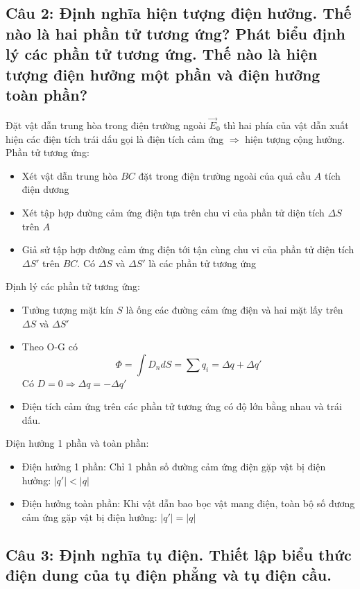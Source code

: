 \subsection[Câu 2]{Câu 2: Định nghĩa hiện tượng điện hưởng. Thế nào là hai phần tử tương ứng? Phát biểu định lý các phần tử tương ứng. Thế nào là hiện tượng điện hưởng một phần và điện hưởng toàn phần?}

Đặt vật dẫn trung hòa trong điện trường ngoài $\vec{E}_0$ thì hai phía của vật dẫn xuất hiện các điện tích trái dấu gọi là điện tích cảm ứng $\Rightarrow$ hiện tượng cộng hưởng.\\

Phần tử tương ứng:
\begin{itemize}
  \item Xét vật dẫn trung hòa $BC$ đặt trong điện trường ngoài của quả cầu $A$ tích điện dương
  \item Xét tập hợp đường cảm ứng điện tựa trên chu vi của phần tử diện tích $\Delta S$ trên $A$
  \item Giả sử tập hợp đường cảm ứng điện tới tận cùng chu vi của phần tử diện tích $\Delta S'$ trên $BC$. Có $\Delta S$ và $\Delta S'$ là các phần tử tương ứng
\end{itemize}

Định lý các phần tử tương ứng:
\begin{itemize}
  \item Tưởng tượng mặt kín $S$ là ống các đường cảm ứng điện và hai mặt lấy trên $\Delta S$ và $\Delta S'$
  \item Theo O-G có 
  \begin{equation*}
    \Phi = \int D_ndS = \sum q_i = \Delta q + \Delta q'
  \end{equation*}
  Có $D = 0 \Rightarrow \Delta q = - \Delta q'$ 
  \item Điện tích cảm ứng trên các phần tử tương ứng có độ lớn bằng nhau và trái dấu.
\end{itemize}

Điện hưởng 1 phần và toàn phần:
\begin{itemize}
  \item Điện hưởng 1 phần: Chỉ 1 phần số đường cảm ứng điện gặp vật bị điện hưởng: $|q'| < |q|$
  \item Điện hưởng toàn phần: Khi vật dẫn bao bọc vật mang điện, toàn bộ số đương cảm ứng gặp vật bị điện hưởng: $|q'| = |q|$
\end{itemize}

\subsection[Câu 3]{Câu 3: Định nghĩa tụ điện. Thiết lập biểu thức điện dung của tụ điện phẳng và tụ điện cầu.}

